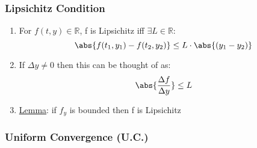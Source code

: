 \documentclass[11pt]{article}
\begin{document}
\subsubsection{Lipsichitz Condition}
\label{sec-9.1.5}

\begin{enumerate}
\item For $f(t,y) \in \mathbb{R}$, f is Lipsichitz iff $\exists L\in \mathbb{R}$:
       \begin{equation}
       \abs{f(t_1,y_1)-f(t_2,y_2)} \leq L\cdot \abs{(y_1-y_2)}
       \end{equation}
\item If $\Delta y \neq 0$ then this can be thought of as:
       \begin{equation}
       \abs{\frac{\Delta f}{\Delta y}} \leq L
       \end{equation}
\item \underline{Lemma}: if $f_y$ is bounded then f is Lipsichitz
\end{enumerate}
\subsubsection{Uniform Convergence (U.C.)}
\label{sec-9.1.6}
\end{document}
